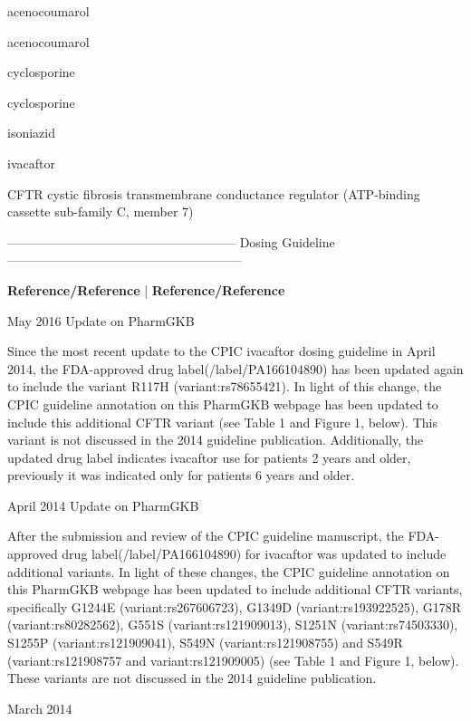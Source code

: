 \documentclass{resume} %
\begin{document}
\begin{rSection}{ acenocoumarol }
\begin{rSection}{ acenocoumarol }
\begin{rSection}{ cyclosporine }
\begin{rSection}{ cyclosporine }
\begin{rSection}{ isoniazid }
\end{rSection}
\begin{rSection}{ ivacaftor }
\item[]
\begin{rSubsection}{ CFTR }{ cystic fibrosis transmembrane conductance regulator (ATP-binding cassette sub-family C, member 7) }{}{}
\item[]
\item[] ------------------------------------------------------ Dosing Guideline --------------------------------------------------------\newline
\item[]
\item[] \textbf{ Reference/Reference } | \textbf{ Reference/Reference }
\item May 2016 Update on PharmGKB
 \newline
\item Since the most recent update to the CPIC ivacaftor dosing guideline in April 2014, the FDA-approved drug label(/label/PA166104890) has been updated again to include the variant R117H (variant:rs78655421). In light of this change, the CPIC guideline annotation on this PharmGKB webpage has been updated to include this additional CFTR variant (see Table 1 and Figure 1, below). This variant is not discussed in the 2014 guideline publication. Additionally, the updated drug label indicates ivacaftor use for patients 2 years and older,  previously it was indicated only for patients 6 years and older. 
 \newline
\item April 2014 Update on PharmGKB
 \newline
\item After the submission and review of the CPIC guideline manuscript, the FDA-approved drug label(/label/PA166104890) for ivacaftor was updated to include additional variants. In light of these changes, the CPIC guideline annotation on this PharmGKB webpage has been updated to include additional CFTR variants, specifically G1244E (variant:rs267606723), G1349D (variant:rs193922525), G178R (variant:rs80282562), G551S (variant:rs121909013), S1251N (variant:rs74503330), S1255P (variant:rs121909041), S549N (variant:rs121908755) and S549R (variant:rs121908757 and variant:rs121909005) (see Table 1 and Figure 1, below).  These variants are not discussed in the 2014 guideline publication.
 \newline
\item March 2014
 \newline

\end{rSubsection}
\end{rSection}
\end{rSection}
\end{rSection}
\end{rSection}
\end{rSection}
\end{document}

